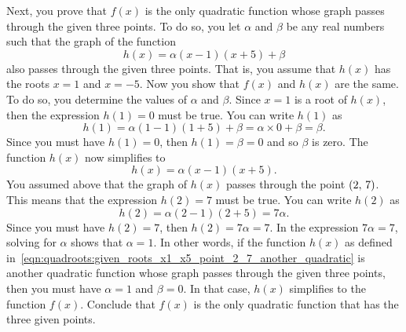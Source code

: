 \documentclass[a4paper,oneside,12pt]{article}
\begin{document}
\begin{problem}
{\begin{solution}
Next, you prove that $f(x)$ is the only quadratic function whose graph
passes through the given three points.  To do so, you let $\alpha$ and
$\beta$ be any real numbers such that the graph of the function
\begin{equation}
\label{eqn:quadroots:given_roots_x1_x5_point_2_7_another_quadratic}
h(x)
=
\alpha (x - 1) (x + 5) + \beta
\end{equation}
also passes through the given three points.  That is, you assume that
$h(x)$ has the roots $x = 1$ and $x = -5$.  Now you show that $f(x)$
and $h(x)$ are the same.  To do so, you determine the values of
$\alpha$ and $\beta$.  Since $x = 1$ is a root of $h(x)$, then the
expression $h(1) = 0$ must be true.  You can write $h(1)$ as
\[
h(1)
=
\alpha (1 - 1) (1 + 5) + \beta
=
\alpha \times 0 + \beta
=
\beta.
\]
Since you must have $h(1) = 0$, then $h(1) = \beta = 0$ and so $\beta$
is zero.  The function $h(x)$ now simplifies to
\[
h(x)
=
\alpha (x - 1) (x + 5).
\]
You assumed above that the graph of $h(x)$ passes through the point
$\left\lparen{2},\, {7}\right\rparen$.  This means that the expression $h(2) = 7$ must be
true.  You can write $h(2)$ as
\[
h(2)
=
\alpha (2 - 1) (2 + 5)
=
7 \alpha.
\]
Since you must have $h(2) = 7$, then $h(2) = 7\alpha = 7$.  In the
expression $7\alpha = 7$, solving for $\alpha$ shows that
$\alpha = 1$.  In other words, if the function $h(x)$ as defined
in~\eqref{eqn:quadroots:given_roots_x1_x5_point_2_7_another_quadratic}
is another quadratic function whose graph passes through the given
three points, then you must have $\alpha = 1$ and $\beta = 0$.  In
that case, $h(x)$ simplifies to the function $f(x)$.  Conclude that
$f(x)$ is the only quadratic function that has the three given
points.
\end{solution}
}{}


\end{problem}
\end{document}
